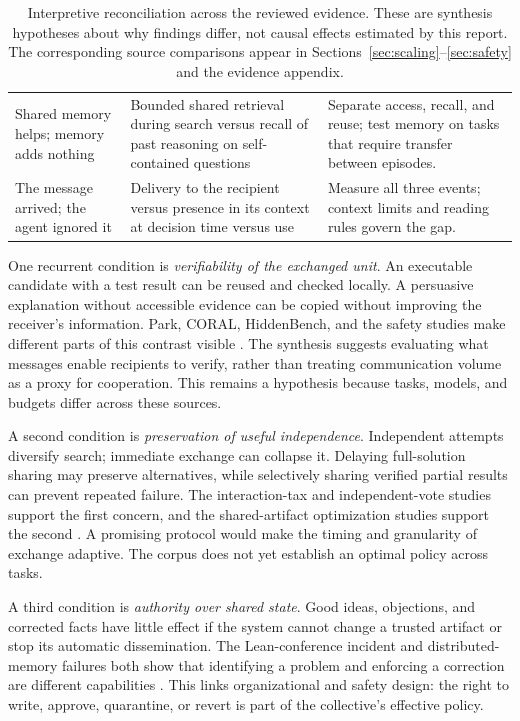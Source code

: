 \begin{table}[t]
\begin{tabularx}{\textwidth}{@{}p{}YY@{}}
Shared memory helps; memory adds nothing & Bounded shared retrieval during search versus recall of past reasoning on self-contained questions & Separate access, recall, and reuse; test memory on tasks that require transfer between episodes.\\\addlinespace[3pt]
The message arrived; the agent ignored it & Delivery to the recipient versus presence in its context at decision time versus use & Measure all three events; context limits and reading rules govern the gap.\\
\bottomrule
\end{tabularx}
\caption{Interpretive reconciliation across the reviewed evidence. These are synthesis hypotheses about why findings differ, not causal effects estimated by this report. The corresponding source comparisons appear in Sections~\ref{sec:scaling}--\ref{sec:safety} and the evidence appendix.}
\label{tab:contradictions}
\end{table}

One recurrent condition is \emph{verifiability of the exchanged unit}. An executable candidate with a test result can be reused and checked locally. A persuasive explanation without accessible evidence can be copied without improving the receiver's information. Park, CORAL, HiddenBench, and the safety studies make different parts of this contrast visible \citep{test-time-communication,coral,hiddenbench,deepmind-cheating-whistleblowing}. The synthesis suggests evaluating what messages enable recipients to verify, rather than treating communication volume as a proxy for cooperation. This remains a hypothesis because tasks, models, and budgets differ across these sources.

A second condition is \emph{preservation of useful independence}. Independent attempts diversify search; immediate exchange can collapse it. Delaying full-solution sharing may preserve alternatives, while selectively sharing verified partial results can prevent repeated failure. The interaction-tax and independent-vote studies support the first concern, and the shared-artifact optimization studies support the second \citep{interaction-tax,debate-or-vote,coral}. A promising protocol would make the timing and granularity of exchange adaptive. The corpus does not yet establish an optimal policy across tasks.

A third condition is \emph{authority over shared state}. Good ideas, objections, and corrected facts have little effect if the system cannot change a trusted artifact or stop its automatic dissemination. The Lean-conference incident and distributed-memory failures both show that identifying a problem and enforcing a correction are different capabilities \citep{deepmind-cheating-whistleblowing,silo-bench}. This links organizational and safety design: the right to write, approve, quarantine, or revert is part of the collective's effective policy.

